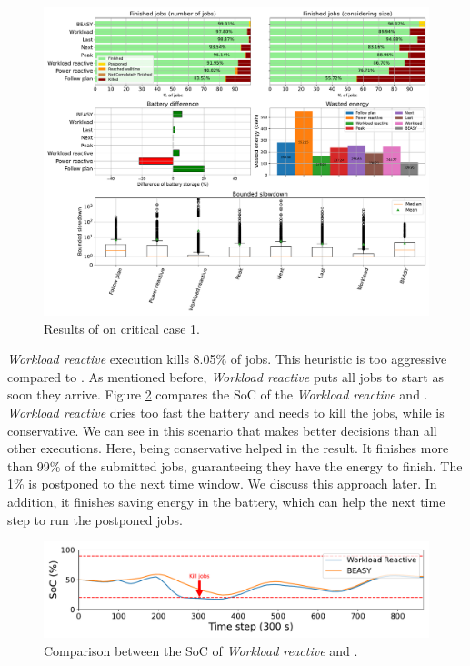 \begin{figure}[!htb]
    \centering
    \includegraphics[scale=0.39]{Images/Heuristic/profile_best_workload_1_with_noise.pdf}
    \caption{Results of \emph{\systemName} on critical case 1.}
    \label{fig:beasy_critical_1}
\end{figure}

\emph{Workload reactive} execution kills 8.05\% of jobs. This heuristic is too aggressive compared to \emph{\systemName}. As mentioned before, \emph{Workload reactive} puts all jobs to start as soon they arrive. Figure \ref{fig:critical_soc_s1} compares the SoC of the \emph{Workload reactive} and \emph{\systemName}. \emph{Workload reactive} dries too fast the battery and needs to kill the jobs, while \emph{\systemName} is conservative. We can see in this scenario that \emph{\systemName} makes better decisions than all other executions. Here, being conservative helped in the result. It finishes more than 99\% of the submitted jobs, guaranteeing they have the energy to finish. The 1\% is postponed to the next time window. We discuss this approach later. In addition, it finishes saving energy in the battery, which can help the next time step to run the postponed jobs.

\begin{figure}[!htb]
    \centering
    \includegraphics[scale=0.5]{Images/Heuristic/critical_soc_s1.pdf}
    \caption{Comparison between the SoC of \emph{Workload reactive} and \emph{\systemName}.}
    \label{fig:critical_soc_s1}
\end{figure}

